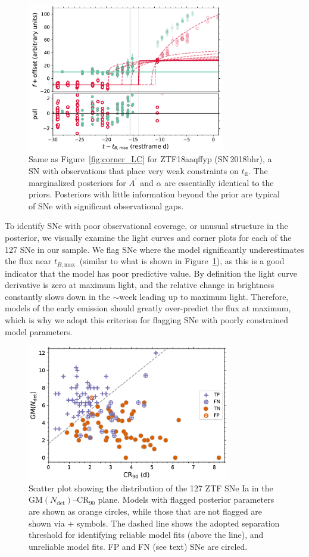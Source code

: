 \documentclass[twocolumn]{./aastex63}
\newcommand{\tfl}{$t_\mathrm{fl}$}
\newcommand{\tbmax}{$t_{B,\mathrm{max}}$}
\begin{document}
\begin{figure}
    \centering
    \includegraphics[width=3.4in]{./figures/ZTF18aaqffyp_model_lc.pdf}
    \caption{Same as Figure~\ref{fig:corner_LC} for ZTF18aaqffyp
    (SN\,2018bhr), a SN with observations that place very weak constraints on
    \tfl. The marginalized posteriors for $A^\prime$ and $\alpha$ are
    essentially identical to the priors. Posteriors with little information
    beyond the prior are typical of SNe with significant observational gaps.}
    \label{fig:biggap_lc}
\end{figure}

To identify SNe with poor observational coverage, or unusual structure in the
posterior, we visually examine the light curves and corner plots for each of
the 127 SNe in our sample. We flag SNe where the model significantly
underestimates the flux near \tbmax\ (similar to what is shown in
Figure~\ref{fig:biggap_lc}), as this is a good indicator that the model has
poor predictive value. By definition the light curve derivative is zero at
maximum light, and the relative change in brightness constantly slows down in
the $\sim$week leading up to maximum light. Therefore, models of the early
emission should greatly over-predict the flux at maximum, which is why we
adopt this criterion for flagging SNe with poorly constrained model
parameters.

\begin{figure}
    \centering
    \includegraphics[width=3.5in]{./figures/final_sample.pdf}
    \caption{Scatter plot showing the distribution of the 127 ZTF SNe Ia in
    the $\mathrm{GM}(N_\mathrm{det})$--$\mathrm{CR}_{90}$ plane. Models with
    flagged posterior parameters are shown as orange circles, while those
    that are not flagged are shown via $+$ symbols. The dashed line shows the
    adopted separation threshold for identifying reliable model fits (above
    the line), and unreliable model fits. FP and FN (see text) SNe are
    circled. }
    \label{fig:flagged_sn}
\end{figure}
\end{document}

